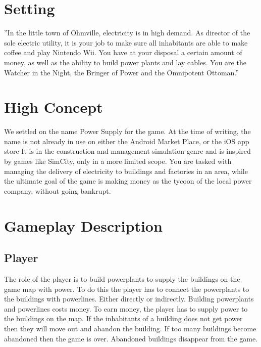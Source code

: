 \section{Setting}
    ”In the little town of Ohmville, electricity is in high demand. As director of the sole electric
    utility, it is your job to make sure all inhabitants are able to make coffee and play Nintendo
    Wii\texttrademark. You have at your disposal a certain amount of money, as well as the ability to build
    power plants and lay cables. You are the Watcher in the Night, the Bringer of Power and the
    Omnipotent Ottoman.”

\section{High Concept}
    We settled on the name Power Supply for the game. At the time of writing, the name is not already
    in use on either the Android Market Place, or the iOS app store It is in the construction and management 
    simulation genre and is inspired by games like SimCity, only in a more limited scope. You are 
    tasked with managing the delivery of electricity to buildings and factories in an area, while the 
    ultimate goal of the game is making money as the tycoon of the local power company, without going 
    bankrupt.

\section{Gameplay Description}

\subsection*{Player}
    The role of the player is to build powerplants to supply the buildings on the game map with power. 
    To do this the player has to connect the powerplants to the buildings with powerlines. Either directly
    or indirectly. Building powerplants and powerlines costs money. To earn money, the player has to supply
    power to the buildings on the map. If the inhabitants of a building does not get power then they will
    move out and abandon the building. If too many buildings become abandoned then the game is over.
    Abandoned buildings disappear from the game.


